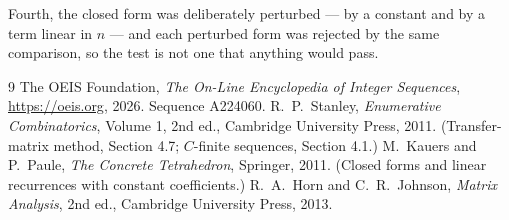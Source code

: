 \documentclass[11pt,a4paper]{article}
\theoremstyle{plain}
\theoremstyle{definition}
\begin{document}
Fourth, the closed form was deliberately perturbed --- by a constant and by a term linear in
$n$ --- and each perturbed form was rejected by the same comparison, so the test is not one
that anything would pass.

\begin{thebibliography}{9}
 The OEIS Foundation, \emph{The On-Line Encyclopedia of Integer
Sequences}, \url{https://oeis.org}, 2026. Sequence A224060.
 R.~P.~Stanley, \emph{Enumerative Combinatorics}, Volume 1, 2nd ed.,
Cambridge University Press, 2011. (Transfer-matrix method, Section 4.7; $C$-finite sequences,
Section 4.1.)
 M.~Kauers and P.~Paule, \emph{The Concrete Tetrahedron}, Springer, 2011.
(Closed forms and linear recurrences with constant coefficients.)
 R.~A.~Horn and C.~R.~Johnson, \emph{Matrix Analysis}, 2nd ed., Cambridge
University Press, 2013.
\end{thebibliography}
\end{document}
